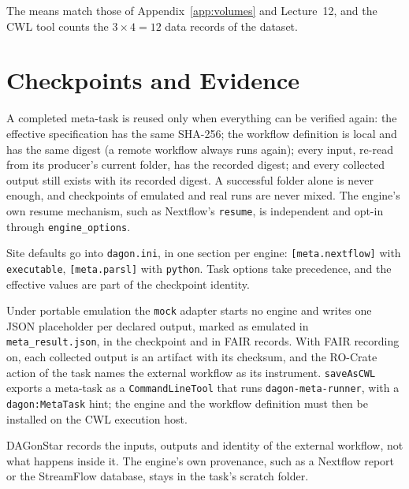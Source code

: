 





The means match those of Appendix~\ref{app:volumes} and Lecture~12, and the CWL
tool counts the $3 \times 4 = 12$ data records of the dataset.

\section{Checkpoints and Evidence}

A completed meta-task is reused only when everything can be verified again:
the effective specification has the same SHA-256; the workflow definition is
local and has the same digest (a remote workflow always runs again); every
input, re-read from its producer's current folder, has the recorded digest;
and every collected output still exists with its recorded digest. A successful
folder alone is never enough, and checkpoints of emulated and real runs are
never mixed. The engine's own resume mechanism, such as Nextflow's
\texttt{resume}, is independent and opt-in through \texttt{engine\_options}.

\begin{practicebox}
Site defaults go into \texttt{dagon.ini}, in one section per engine:
\texttt{[meta.nextflow]} with \texttt{executable}, \texttt{[meta.parsl]} with
\texttt{python}. Task options take precedence, and the effective values are part
of the checkpoint identity.
\end{practicebox}

Under portable emulation the \texttt{mock} adapter starts no engine and writes
one JSON placeholder per declared output, marked as emulated in
\texttt{meta\_result.json}, in the checkpoint and in FAIR records. With FAIR
recording on, each collected output is an artifact with its checksum, and the
RO-Crate action of the task names the external workflow as its instrument.
\texttt{saveAsCWL} exports a meta-task as a \texttt{CommandLineTool} that runs
\texttt{dagon-meta-runner}, with a \texttt{dagon:MetaTask} hint; the engine and
the workflow definition must then be installed on the CWL execution host.

\begin{cautionbox}
DAGonStar records the inputs, outputs and identity of the external workflow,
not what happens inside it. The engine's own provenance, such as a Nextflow
report or the StreamFlow database, stays in the task's scratch folder.
\end{cautionbox}
